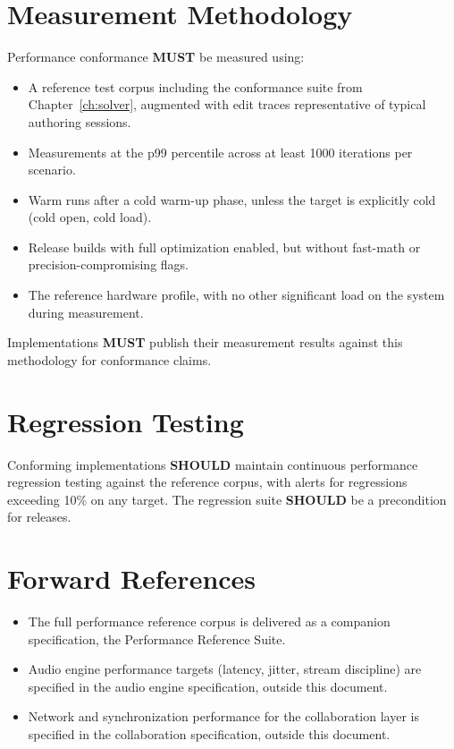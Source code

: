 \documentclass[11pt,letterpaper]{report}
\newcounter{requirement}[chapter]
\newcommand{\MUST}{\textbf{MUST}}
\newcommand{\SHOULD}{\textbf{SHOULD}}
\begin{document}
\section{Measurement Methodology}
\label{sec:perf:methodology}

\begin{requirement}
  \label{req:perf:measurement-methodology}
  Performance conformance \MUST{} be measured using:

  \begin{itemize}
    \item A reference test corpus including the conformance suite
      from Chapter~\ref{ch:solver}, augmented with edit traces
      representative of typical authoring sessions.
    \item Measurements at the p99 percentile across at least 1000
      iterations per scenario.
    \item Warm runs after a cold warm-up phase, unless the target
      is explicitly cold (cold open, cold load).
    \item Release builds with full optimization enabled, but without
      fast-math or precision-compromising flags.
    \item The reference hardware profile, with no other significant
      load on the system during measurement.
  \end{itemize}

  Implementations \MUST{} publish their measurement results against
  this methodology for conformance claims.
\end{requirement}

\section{Regression Testing}
\label{sec:perf:regression}

\begin{requirement}
  \label{req:perf:performance-regression-gate}
  Conforming implementations \SHOULD{} maintain continuous
  performance regression testing against the reference corpus, with
  alerts for regressions exceeding 10\% on any target. The
  regression suite \SHOULD{} be a precondition for releases.
\end{requirement}

\section{Forward References}

\begin{itemize}
  \item The full performance reference corpus is delivered as a
    companion specification, the Performance Reference Suite.
  \item Audio engine performance targets (latency, jitter, stream
    discipline) are specified in the audio engine specification,
    outside this document.
  \item Network and synchronization performance for the collaboration
    layer is specified in the collaboration specification, outside
    this document.
\end{itemize}
\end{document}

